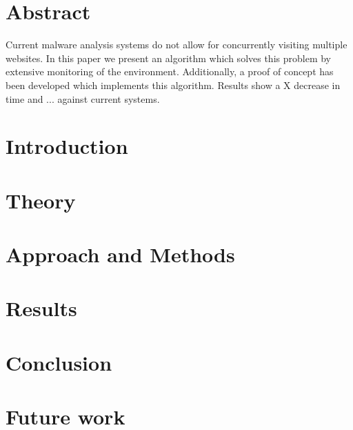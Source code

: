 \documentclass{scrartcl}
\begin{document}
\clearpage
\restoregeometry

\section*{Abstract}

Current malware analysis systems do not allow for concurrently visiting multiple websites. In this paper we present an algorithm which solves this problem by extensive monitoring of the environment. Additionally, a proof of concept has been developed which implements this algorithm. Results show a X decrease in time and ... against current systems.

\clearpage

\tableofcontents

\clearpage


\section{Introduction}


\clearpage

\section{Theory}


\clearpage

\section{Approach and Methods}


\clearpage

\section{Results}


\clearpage

\section{Conclusion}


\clearpage

\section{Future work}

\end{document}
